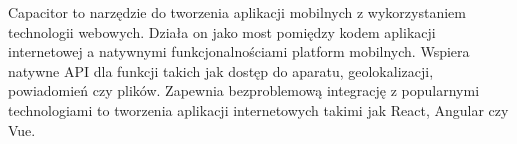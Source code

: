 Capacitor to narzędzie do tworzenia aplikacji mobilnych z wykorzystaniem technologii webowych. Działa on jako most pomiędzy kodem aplikacji internetowej a natywnymi funkcjonalnościami platform mobilnych. Wspiera natywne API dla funkcji takich jak dostęp do aparatu, geolokalizacji, powiadomień czy plików. Zapewnia bezproblemową integrację z popularnymi technologiami to tworzenia aplikacji internetowych takimi jak React, Angular czy Vue. \autocite{capacitor}